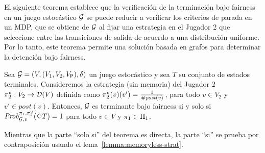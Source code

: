 El siguiente teorema establece que la verificación de la terminación bajo fairness en un
juego estocástico $\mathcal{G}$ se puede reducir a verificar los criterios de parada
en un MDP, que se obtiene de $\mathcal{G}$ al fijar una estrategia en
el Jugador 2 que seleccione entre las transiciones de salida de acuerdo a una
distribución uniforme. Por lo tanto, este teorema permite una solución basada en grafos para
determinar la detención bajo fairness.


\begin{theorem}\label{thm:uniform-prob}
  Sea $\mathcal{G} = (V, (V_1, V_2, V_{\mathsf{P}}), \delta)$ un juego estocástico y sea $T$ su conjunto de estados terminales.
  Consideremos la estrategia (sin memoria) del Jugador $2$
  $\pi^{\mathrm{u}}_{2} : V_2 \rightarrow \mathcal{D}(V)$ definida como
  $\pi^{\mathrm{u}}_{2}(v)(v') = \frac{1}{\# \mathit{post}(v)}$, para todo $v \in
  V_2$ y $v' \in post(v)$.
  Entonces, $\mathcal{G}$ es terminante bajo fairness si y solo si
  $\mathit{Prob}^{\pi_{1}, \pi^{\mathrm{u}}_{2}}_{\mathcal{G},v}(\Diamond T)=1$ para
  todo $v\in V$ y $\pi_{1} \in \Pi_{1}$.
\end{theorem}

Mientras que la parte ``solo si'' del teorema es directa, la parte ``si'' se prueba por
contraposición usando el lema~\ref{lemma:memoryless-strat}.

